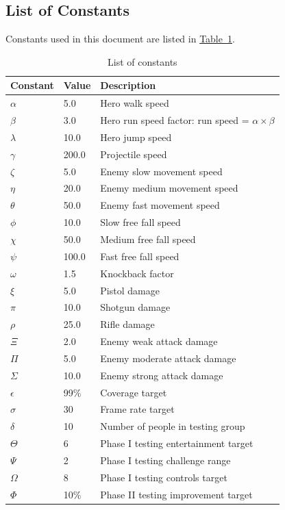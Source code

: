 \documentclass[12pt, titlepage]{article}
\begin{document}
\subsection{List of Constants}
Constants used in this document are listed in \hyperref[tab:constants]{Table~\ref*{tab:constants}}.
\begin{table}[ht]
\caption{List of constants} \label{tab:constants}
\begin{tabularx}{\textwidth}{p{3cm}p{2cm}X}
\toprule {\bf Constant} & {\bf Value} & {\bf Description}\\
\midrule
$\alpha$ & 5.0 & Hero walk speed\\
$\beta$ & 3.0 & Hero run speed factor: run speed = $\alpha \times \beta$\\
$\lambda$ & 10.0 & Hero jump speed\\ 
$\gamma$ & 200.0 & Projectile speed\\
$\zeta$ & 5.0 & Enemy slow movement speed\\
$\eta$ & 20.0 & Enemy medium movement speed\\
$\theta$ & 50.0 & Enemy fast movement speed\\
$\phi$ & 10.0 & Slow free fall speed\\
$\chi$ & 50.0 & Medium free fall speed\\
$\psi$ & 100.0 & Fast free fall speed\\
$\omega$ & 1.5 & Knockback factor\\
$\xi$ & 5.0 & Pistol damage\\
$\pi$ & 10.0 & Shotgun damage\\
$\rho$ & 25.0 & Rifle damage\\
$\Xi$ & 2.0 & Enemy weak attack damage\\
$\Pi$ & 5.0 & Enemy moderate attack damage\\
$\Sigma$ & 10.0 & Enemy strong attack damage\\
$\epsilon$ & 99\% & Coverage target\\
$\sigma$ & 30 & Frame rate target\\
$\delta$ & 10 & Number of people in testing group\\
$\Theta$ & 6 & Phase I testing entertainment target\\
$\Psi$ & 2 & Phase I testing challenge range\\
$\Omega$ & 8 & Phase I testing controls target\\
$\Phi$ & 10\% & Phase II testing improvement target\\

\bottomrule
\end{tabularx}
\end{table}
\end{document}
